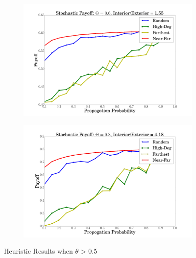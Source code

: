 \documentclass{article}
\begin{document}
  \begin{figure}
  \begin{subfigure}{\linewidth}
\includegraphics[width=1\textwidth]{../plots/actual/theta=6.png}
  \end{subfigure}
   \begin{subfigure}{\linewidth}
\includegraphics[width=1\textwidth]{../plots/actual/theta=8.png}
  \end{subfigure}
  \caption{Heuristic Results when $\theta$ > 0.5}
\end{figure}
\end{document}
